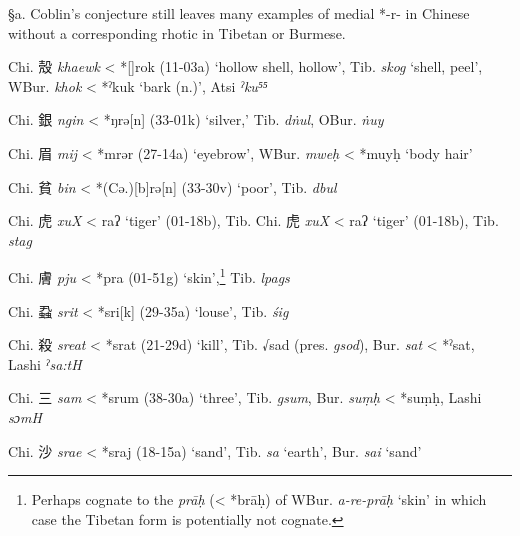 §a. Coblin's conjecture still leaves many examples of medial *-r- in
Chinese without a corresponding rhotic in Tibetan or Burmese.

\begin{description} \item
Chi. 殼 \emph{khaewk} \textless{} *[{}]{}rok (11-03a) `hollow shell,
hollow', Tib. {} \emph{skog} `shell, peel', WBur. {} \emph{khok}
\textless{} *ˀkuk `bark (n.)', Atsi  \emph{ˀku⁵⁵}
\item
Chi. 銀 \emph{ngin} \textless{} *ŋrə[n] (33-01k) `silver,' Tib.{} \emph{dṅul}, OBur. {} \emph{ṅuy}
\item
Chi. 眉 \emph{mij} \textless{} *mrər (27-14a) `eyebrow', WBur. {} \emph{mweḥ} \textless{} *muyḥ `body hair'
\item
Chi. 貧 \emph{bin} \textless{} *(Cə.){[}b]rə[n] (33-30v) `poor',
Tib. {} \emph{dbul}
\item
Chi. 虎 \emph{xuX} \textless{} {}{}raʔ `tiger' (01-18b), Tib.
\protect\hypertarget{anchor-49}{}{}Chi. 虎 \emph{xuX} \textless{}
{}{}raʔ `tiger' (01-18b), Tib. {} \emph{stag}
\item
Chi. 膚 \emph{pju} \textless{} *pra (01-51g) `skin',\footnote{Perhaps
  cognate to the {} \emph{prāḥ} (\textless{} *brāḥ) of WBur. {} \emph{a-re-prāḥ} `skin' in which case the Tibetan form is potentially
  not cognate.} Tib. {} \emph{lpags}
\item
Chi. 蝨 \emph{srit} \textless{} *sri{[}k] (29-35a) `louse', Tib. {} \emph{śig}
\item
Chi. 殺 \emph{sreat} \textless{} *srat (21-29d) `kill', Tib. √sad (pres. {} \emph{gsod}), Bur. {} \emph{sat} \textless{} *ˀsat, Lashi
 \emph{ˀsa:tH}
 \item
Chi. 三 \emph{sam} \textless{} *srum (38-30a) `three', Tib. {} \emph{gsum}, Bur. {} \emph{suṃḥ} \textless{} *suṃḥ, Lashi  \emph{sɔmH}
\item
Chi. 沙 \emph{srae} \textless{} *s{}raj (18-15a) `sand', Tib. {} \emph{sa} `earth', Bur. {} \emph{sai} `sand'
\end{description}

